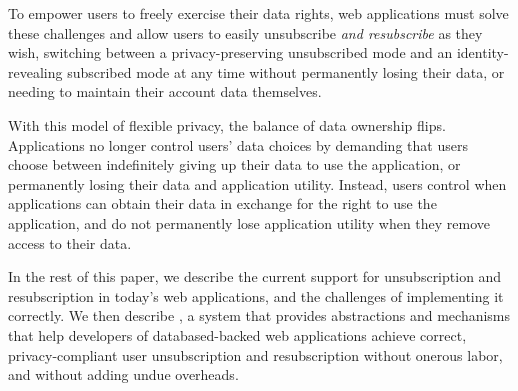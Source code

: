 To empower users to freely exercise their data rights, web applications must solve these challenges
and allow users to easily unsubscribe \emph{and resubscribe} as they wish, switching between a
privacy-preserving unsubscribed mode and an identity-revealing subscribed mode at any time without
permanently losing their data, or needing to maintain their account data themselves. 

%
With this model of flexible privacy, the balance of data ownership flips. Applications no longer
control users' data choices by demanding that users choose between indefinitely giving up their data
to use the application, or permanently losing their data and application utility.
Instead, users control when applications can obtain their data in exchange for the right to use the application, and do not permanently lose application utility when they remove access to their data.

In the rest of this paper, we describe the current support for unsubscription and resubscription in
today's web applications, and the challenges of implementing it correctly.  We then describe \sys, a
system that provides abstractions and mechanisms that help developers of databased-backed web
applications achieve correct, privacy-compliant user unsubscription and resubscription without
onerous labor, and without adding undue overheads.
